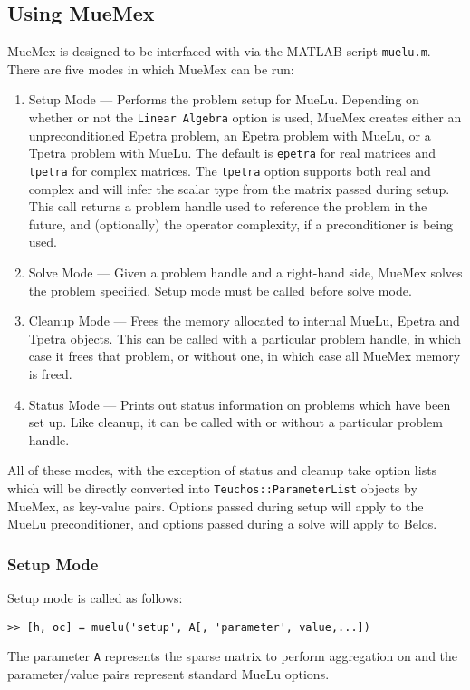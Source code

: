 \subsection{Using MueMex}\label{sec:muemex:usage}
MueMex is designed to be interfaced with via the MATLAB script
\texttt{muelu.m}.  There are five modes in which MueMex can be run:
\begin{enumerate}
\item Setup Mode --- Performs the problem setup for MueLu.
  Depending on whether or not the \texttt{Linear Algebra} option is
  used, MueMex creates either an unpreconditioned Epetra problem,
  an Epetra problem with MueLu, or a Tpetra problem with MueLu.
  The default is \texttt{epetra} for real matrices and \texttt{tpetra}
  for complex matrices. The \texttt{tpetra} option
  supports both real and complex and will infer the scalar type
  from the matrix passed during setup.  This call returns a problem 
  handle used to reference the problem in the future, and (optionally)
  the operator complexity, if a preconditioner is being used.
\item Solve Mode --- Given a problem handle and a right-hand side, MueMex
  solves the problem specified.  Setup mode must be called before
  solve mode.
\item Cleanup Mode --- Frees the memory allocated to internal MueLu,
  Epetra and Tpetra objects.  This can be called with a particular 
  problem handle, in which case it frees that problem, or without one, 
  in which case all MueMex memory is freed.
\item Status Mode --- Prints out status information on problems which
  have been set up.  Like cleanup, it can be called with or without a
  particular problem handle.
\end{enumerate}
All of these modes, with the exception of status and cleanup take
option lists which will be directly converted into
\texttt{Teuchos::ParameterList} objects by MueMex, as key-value pairs.
Options passed during setup will apply to the MueLu preconditioner, and
options passed during a solve will apply to Belos.

\subsubsection{Setup Mode}
Setup mode is called as follows:
\begin{verbatim}
>> [h, oc] = muelu('setup', A[, 'parameter', value,...]) 
\end{verbatim}
The parameter \texttt{A} represents the sparse matrix to perform aggregation on
and the parameter/value pairs represent standard MueLu options.

